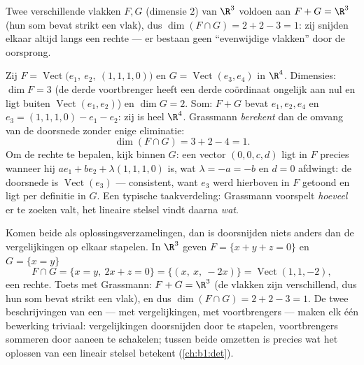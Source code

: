 \begin{example}\label{ex:b1:findim:planes}
Twee verschillende vlakken $F, G$ (dimensie $2$) van $\R^3$ voldoen
aan $F + G = \R^3$ (hun som bevat strikt een vlak), dus $\dim(F \cap
G) = 2 + 2 - 3 = 1$: zij snijden elkaar altijd langs een rechte ---
er bestaan geen ``evenwijdige vlakken'' door de oorsprong.
\end{example}

\begin{example}
\label{ex:b1:findim:grassmannrun}
Zij $F = \operatorname{Vect}\bigl(e_1,\ e_2,\ (1,1,1,0)\bigr)$ en
$G = \operatorname{Vect}(e_3, e_4)$ in $\R^4$. Dimensies: $\dim F
= 3$ (de derde voortbrenger heeft een derde coördinaat ongelijk
aan nul en ligt buiten $\operatorname{Vect}(e_1, e_2)$) en $\dim G
= 2$. Som: $F + G$ bevat $e_1, e_2, e_4$ en $e_3 = (1,1,1,0) - e_1
- e_2$: zij is heel $\R^4$. Grassmann \emph{berekent} dan de
omvang van de doorsnede zonder enige eliminatie:
\[
\dim(F \cap G) = 3 + 2 - 4 = 1 .
\]
Om de rechte te bepalen, kijk binnen $G$: een vector $(0, 0, c,
d)$ ligt in $F$ precies wanneer hij $a e_1 + b e_2 +
\lambda(1,1,1,0)$ is, wat $\lambda = -a = -b$ en $d = 0$ afdwingt:
de doorsnede is $\operatorname{Vect}(e_3)$ --- consistent, want
$e_3$ werd hierboven in $F$ getoond en ligt per definitie in $G$.
Een typische taakverdeling: Grassmann voorspelt \emph{hoeveel} er
te zoeken valt, het lineaire stelsel vindt daarna \emph{wat}.
\end{example}

\begin{example}
\label{ex:b1:findim:intersectequations}
Komen beide  als oplossingsverzamelingen, dan is
doorsnijden niets anders dan de vergelijkingen op elkaar stapelen.
In $\R^3$ geven $F = \{x + y + z = 0\}$ en $G = \{x = y\}$
\[
F \cap G = \{x = y,\ 2x + z = 0\}
= \{(x,\ x,\ -2x)\} = \operatorname{Vect}(1, 1, -2),
\]
een rechte. Toets met Grassmann: $F + G = \R^3$ (de vlakken zijn
verschillend, dus hun som bevat strikt een vlak), en dus $\dim(F\cap
G) = 2 + 2 - 3 = 1$. De twee beschrijvingen van een  ---
met vergelijkingen, met voortbrengers --- maken elk één bewerking
triviaal: vergelijkingen doorsnijden door te stapelen,
voortbrengers sommeren door aaneen te schakelen; tussen beide
omzetten is precies wat het oplossen van een lineair stelsel
betekent (\cref{ch:b1:det}).
\end{example}


